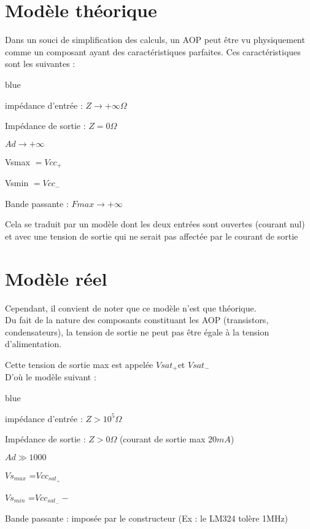 \section{Modèle théorique}


Dans un souci de simplification des calculs, un AOP peut être vu physiquement comme un composant ayant des caractéristiques parfaites. 
Ces caractéristiques sont les suivantes :

\begin{items}{blue}{\Triangle}
  \item impédance d’entrée :  $Z\rightarrow+\infty \Omega$ 
  \item Impédance de sortie : $Z=0 \Omega$  
  \item $Ad\rightarrow+\infty$
  \item Vsmax $ = Vcc_+$
  \item Vsmin $ = Vcc_-$
  \item Bande passante : $Fmax\rightarrow+\infty$ 
\end{items}

Cela se traduit par un modèle dont les deux entrées sont ouvertes (courant nul) et avec une tension de sortie qui ne serait pas affectée par le courant de sortie


\section{Modèle réel} 


Cependant, il convient de noter que ce modèle n’est que théorique.\\

Du fait de la nature des composants constituant les AOP (transistors, condensateurs), la tension de sortie ne peut pas être égale à la tension d’alimentation. 

Cette tension de sortie max est appelée $Vsat_+$et $Vsat_-$ \\

D'où le modèle suivant : 

\begin{items}{blue}{\Triangle}
  \item impédance d’entrée :  $Z>10^5 \Omega$
  \item Impédance de sortie : $Z>0 \Omega$ (courant de sortie max $20mA$)
  \item $Ad \gg 1000$
  \item $Vs_{max}$ =$Vcc_{sat_+}$
  \item $Vs_{min}$ =$Vcc_{sat_-}-$
  \item Bande passante : imposée par le constructeur (Ex : le LM324 tolère 1MHz)
\end{items}


